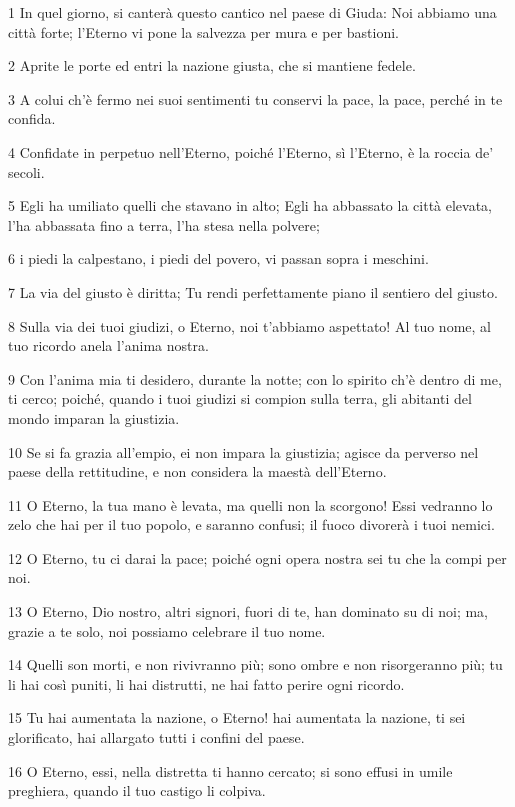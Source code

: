 \par 1 In quel giorno, si canterà questo cantico nel paese di Giuda: Noi abbiamo una città forte; l'Eterno vi pone la salvezza per mura e per bastioni.
\par 2 Aprite le porte ed entri la nazione giusta, che si mantiene fedele.
\par 3 A colui ch'è fermo nei suoi sentimenti tu conservi la pace, la pace, perché in te confida.
\par 4 Confidate in perpetuo nell'Eterno, poiché l'Eterno, sì l'Eterno, è la roccia de' secoli.
\par 5 Egli ha umiliato quelli che stavano in alto; Egli ha abbassato la città elevata, l'ha abbassata fino a terra, l'ha stesa nella polvere;
\par 6 i piedi la calpestano, i piedi del povero, vi passan sopra i meschini.
\par 7 La via del giusto è diritta; Tu rendi perfettamente piano il sentiero del giusto.
\par 8 Sulla via dei tuoi giudizi, o Eterno, noi t'abbiamo aspettato! Al tuo nome, al tuo ricordo anela l'anima nostra.
\par 9 Con l'anima mia ti desidero, durante la notte; con lo spirito ch'è dentro di me, ti cerco; poiché, quando i tuoi giudizi si compion sulla terra, gli abitanti del mondo imparan la giustizia.
\par 10 Se si fa grazia all'empio, ei non impara la giustizia; agisce da perverso nel paese della rettitudine, e non considera la maestà dell'Eterno.
\par 11 O Eterno, la tua mano è levata, ma quelli non la scorgono! Essi vedranno lo zelo che hai per il tuo popolo, e saranno confusi; il fuoco divorerà i tuoi nemici.
\par 12 O Eterno, tu ci darai la pace; poiché ogni opera nostra sei tu che la compi per noi.
\par 13 O Eterno, Dio nostro, altri signori, fuori di te, han dominato su di noi; ma, grazie a te solo, noi possiamo celebrare il tuo nome.
\par 14 Quelli son morti, e non rivivranno più; sono ombre e non risorgeranno più; tu li hai così puniti, li hai distrutti, ne hai fatto perire ogni ricordo.
\par 15 Tu hai aumentata la nazione, o Eterno! hai aumentata la nazione, ti sei glorificato, hai allargato tutti i confini del paese.
\par 16 O Eterno, essi, nella distretta ti hanno cercato; si sono effusi in umile preghiera, quando il tuo castigo li colpiva.
